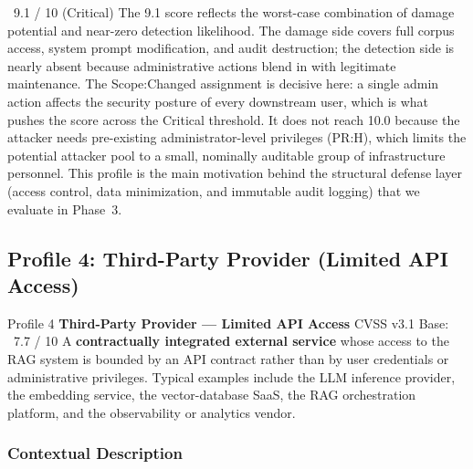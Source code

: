 \begin{cvssbox}{\badgecritical\ 9.1 / 10 (Critical)}
\small The 9.1 score reflects the worst-case combination of damage
potential and near-zero detection likelihood. The damage side covers
full corpus access, system prompt modification, and audit destruction;
the detection side is nearly absent because administrative actions
blend in with legitimate maintenance. The Scope:Changed assignment is
decisive here: a single admin action affects the security posture of
every downstream user, which is what pushes the score across the
Critical threshold. It does not reach 10.0 because the attacker needs
pre-existing administrator-level privileges (PR:H), which limits the
potential attacker pool to a small, nominally auditable group of
infrastructure personnel. This profile is the main motivation behind
the structural defense layer (access control, data minimization, and
immutable audit logging) that we evaluate in Phase~3.
\end{cvssbox}


\newpage
\subsection{Profile 4: Third-Party Provider (Limited API Access)}

\begin{profilebanner}%
  {Profile 4 \enspace\textbf{Third-Party Provider --- Limited API Access}}%
  {CVSS v3.1 Base: \badgehigh\ 7.7 / 10}
  \small
  A \textbf{contractually integrated external service} whose access to the
  RAG system is bounded by an API contract rather than by user credentials
  or administrative privileges. Typical examples include the LLM inference
  provider, the embedding service, the vector-database SaaS, the RAG
  orchestration platform, and the observability or analytics vendor.
\end{profilebanner}

\subsubsection{Contextual Description}

